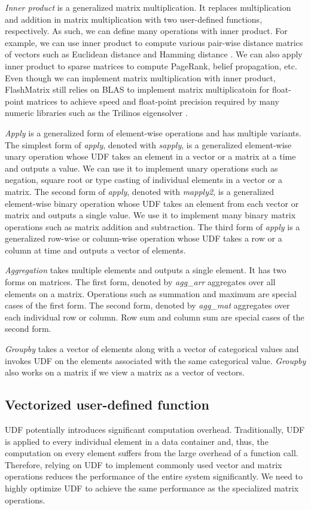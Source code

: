 \textit{Inner product} is a generalized matrix multiplication. It replaces
multiplication and addition in matrix multiplication with two user-defined
functions, respectively. As such, we can define many operations with inner
product. For example, we can use inner product to compute various pair-wise
distance matrics of vectors such as Euclidean distance \cite{euclidean} and
Hamming distance \cite{hamming}. We can also apply inner product to sparse
matrices to compute PageRank, belief propagation, etc.
Even though we can implement matrix multiplication with inner product,
FlashMatrix still relies on BLAS to implement matrix multiplicatoin for
float-point matrices to achieve speed and float-point precision required by
many numeric libraries such as the Trilinos eigensolver \cite{anasazi}.

\textit{Apply} is a generalized form of element-wise operations and has
multiple variants. The simplest form of \textit{apply}, denoted with
\textit{sapply}, is a generalized element-wise unary operation whose
UDF takes an element in a vector or a matrix at a time and outputs a value.
We can use it to implement unary operations such as negation, square root
or type casting of individual elements in a vector or a matrix. The second
form of \textit{apply}, denoted with \textit{mapply2}, is a generalized
element-wise binary operation whose UDF takes an element from each vector
or matrix and outputs a single value. We use it to implement
many binary matrix operations such as matrix addition and subtraction.
The third form of \textit{apply} is a generalized row-wise or column-wise
operation whose UDF takes a row or a column at time and outputs a vector of
elements.

\textit{Aggregation} takes multiple elements and outputs a single element.
It has two forms on matrices. The first form, denoted by \textit{agg\_arr}
aggregates over all elements on a matrix. Operations such as summation and
maximum are special cases of the first form. The second form, denoted by
\textit{agg\_mat} aggregates over each individual row or column.
Row sum and column sum are special cases of the second form.

\textit{Groupby} takes a vector of elements along with a vector of categorical
values and invokes UDF on the elements associated with the same categorical
value. \textit{Groupby} also works on a matrix if we view a matrix as a vector
of vectors.

\subsection{Vectorized user-defined function}
UDF potentially introduces significant computation overhead. Traditionally,
UDF is applied to every individual element in a data container and, thus,
the computation on every element suffers from the large overhead of a function
call. Therefore, relying on UDF to implement commonly used vector and matrix
operations reduces the performance of the entire system significantly.
We need to highly optimize UDF to achieve the same performance as
the specialized matrix operations.

